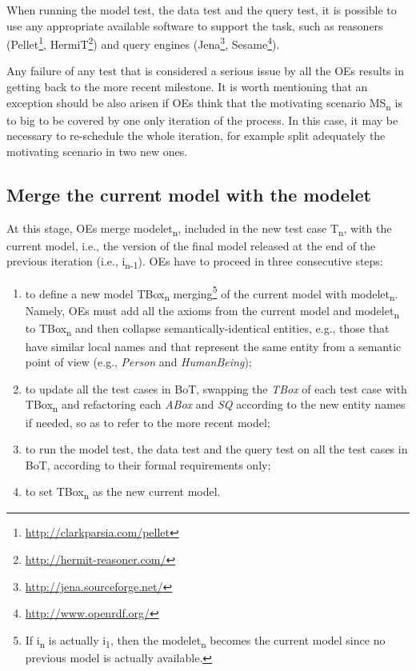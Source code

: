 \documentclass[runningheads,a4paper]{llncs}
\begin{document}
When running the model test, the data test and the query test, it is possible to use any appropriate available software to support the task, such as reasoners (Pellet\footnote{\url{http://clarkparsia.com/pellet}}, HermiT\footnote{\url{http://hermit-reasoner.com/}}) and query engines (Jena\footnote{\url{http://jena.sourceforge.net/}}, Sesame\footnote{\url{http://www.openrdf.org/}}).

Any failure of any test that is considered a serious issue by all the OEs results in getting back to the more recent milestone. It is worth mentioning that an exception should be also arisen if OEs think that the motivating scenario MS\textsubscript{n} is to big to be covered by one only iteration of the process. In this case, it may be necessary to re-schedule the whole iteration, for example split adequately the motivating scenario in two new ones.

\subsection{Merge the current model with the modelet}

At this stage, OEs merge modelet\textsubscript{n}, included in the new test case T\textsubscript{n}, with the current model, i.e., the version of the final model released at the end of the previous iteration (i.e., i\textsubscript{n-1}). OEs have to proceed in three consecutive steps:
\begin{enumerate}
\item to define a new model TBox\textsubscript{n} merging\footnote{If i\textsubscript{n} is actually i\textsubscript{1}, then the modelet\textsubscript{n} becomes the current model since no previous model is actually available.} of the current model with modelet\textsubscript{n}. Namely, OEs must add all the axioms from the current model and modelet\textsubscript{n} to TBox\textsubscript{n} and then collapse semantically-identical entities, e.g., those that have similar local names and that represent the same entity from a semantic point of view (e.g., {\em Person} and {\em HumanBeing});
\item to update all the test cases in BoT, swapping the {\em TBox} of each test case with TBox\textsubscript{n} and refactoring each {\em ABox} and {\em SQ} according to the new entity names if needed, so as to refer to the more recent model;
\item to run the model test, the data test and the query test on all the test cases in BoT, according to their formal requirements only;
\item to set TBox\textsubscript{n} as the new current model.
\end{enumerate}
\end{document}

